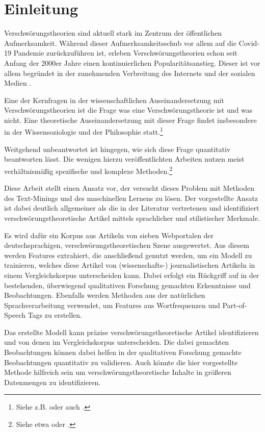 \section{Einleitung}

Verschwörungstheorien sind aktuell stark im Zentrum der öffentlichen Aufmerksamkeit.
Während dieser Aufmerksamkeitsschub vor allem auf die Covid-19 Pandemie zurückzuführen ist, erleben Verschwörungstheorien schon seit Anfang der 2000er Jahre einen kontinuierlichen Popularitätsanstieg.
Dieser ist vor allem begründet in der zunehmenden Verbreitung des Internets und der sozialen Medien \parencite[vgl.][492]{stano_2020}.

Eine der Kernfragen in der wissenschaftlichen Auseinandersetzung mit Verschwörungstheorien ist die Frage was eine Verschwörungstheorie ist und was nicht.
Eine theoretische Auseinandersetzung mit dieser Frage findet insbesondere in der Wissensoziologie und der Philosophie statt.\footnote{Siehe z.B. \textcite[]{coady_2006} oder auch \textcite[23-53]{uscinski_2014}.}

Weitgehend unbeantwortet ist hingegen, wie sich diese Frage quantitativ beantworten lässt.
Die wenigen hierzu veröffentlichten Arbeiten nutzen meist verhältnismäßig spezifische und komplexe Methoden.\footnote{Siehe etwa \textcite[]{samory_2018} oder \textcite[]{shahsavari_2020}.}

Diese Arbeit stellt einen Ansatz vor, der versucht dieses Problem mit Methoden des Text-Minings und des maschinellen Lernens zu lösen.
Der vorgestellte Ansatz ist dabei deutlich allgemeiner als die in der Literatur vertretenen und identifiziert verschwörungstheoretische Artikel mittels sprachlicher und stilistischer Merkmale.

Es wird dafür ein Korpus aus Artikeln von sieben Webportalen der deutschsprachigen, verschwörungstheoretischen Szene ausgewertet. 
Aus diesem werden Features extrahiert, die anschließend genutzt werden, um ein Modell zu trainieren, welches diese Artikel von (wissenschafts-) journalistischen Artikeln in einem Vergleichskorpus unterscheiden kann.
Dabei erfolgt ein Rückgriff auf in der bestehenden, überwiegend qualitativen Forschung gemachten Erkenntnisse und Beobachtungen.
Ebenfalls werden Methoden aus der natürlichen Sprachverarbeitung verwendet, um Features aus Wortfrequenzen und Part-of-Speech Tags zu erstellen.

Das erstellte Modell kann präzise verschwörungstheoretische Artikel identifizieren und von denen im Vergleichskorpus unterscheiden.
Die dabei gemachten Beobachtungen können dabei helfen in der qualitativen Forschung gemachte Beobachtungen quantitativ zu validieren.
Auch könnte die hier vorgestellte Methode hilfreich sein um verschwörungstheoretische Inhalte in größeren Datenmengen zu identifizieren.
